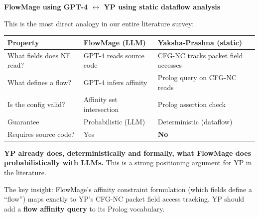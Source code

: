 \begin{analogybox}
\textbf{FlowMage using GPT-4 $\leftrightarrow$ YP using static dataflow analysis}

This is the most direct analogy in our entire literature survey:

\begin{center}
\begin{tabular}{lll}
\toprule
\textbf{Property} & \textbf{FlowMage (LLM)} & \textbf{Yaksha-Prashna (static)} \\
\midrule
What fields does NF read? & GPT-4 reads source code & CFG-NC tracks packet field accesses \\
What defines a flow? & GPT-4 infers affinity & Prolog query on CFG-NC reads \\
Is the config valid? & Affinity set intersection & Prolog assertion check \\
Guarantee & Probabilistic (LLM) & Deterministic (dataflow) \\
Requires source code? & Yes & \textbf{No} \\
\bottomrule
\end{tabular}
\end{center}

\textbf{YP already does, deterministically and formally, what FlowMage does probabilistically with LLMs.} This is a strong positioning argument for YP in the literature.

The key insight: FlowMage's affinity constraint formulation (which fields define a ``flow'') maps exactly to YP's CFG-NC packet field access tracking. YP should add a \textbf{flow affinity query} to its Prolog vocabulary.
\end{analogybox}

